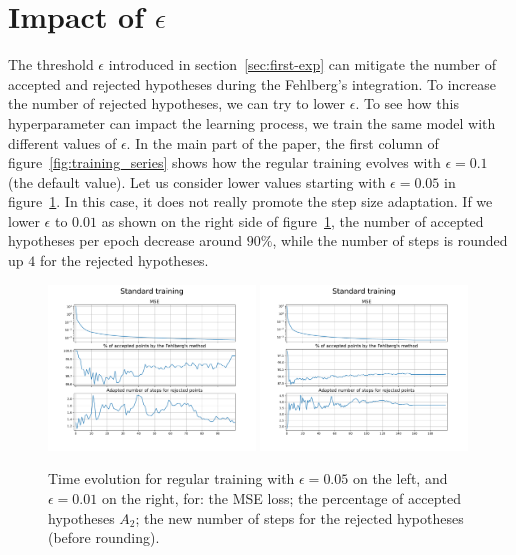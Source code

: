 \documentclass{article}
\newcommand{\eps}{\ensuremath{\epsilon}}
\begin{document}
\section{Impact of $\eps$}
\label{sec:eps}
The threshold $\eps$ introduced in section~\ref{sec:first-exp} can
mitigate the number of accepted and rejected hypotheses during the
Fehlberg's integration. To increase the number of rejected hypotheses,
we can try to lower $\eps$. To see how this hyperparameter can impact
the learning process, we train the same model with different values of
$\eps$. In the main part of the paper, the first column of
figure~\ref{fig:training_series} shows how the regular training
evolves with $\eps=0.1$ (the default value). Let us consider lower
values starting with $\eps=0.05$ in
figure~\ref{fig:training_series_eps}. In this case, it does not really
promote the step size adaptation. If we lower $\eps$ to $0.01$ as
shown on the right side of figure~\ref{fig:training_series_eps}, the
number of accepted hypotheses per epoch decrease around $90\%$, while
the number of steps is rounded up $4$ for the rejected hypotheses.
\begin{figure}[thb]
  \centering
  \includegraphics[width=0.49\textwidth]{./figs/baseline_eps0.05.pdf}
  \includegraphics[width=0.49\textwidth]{./figs/baseline_eps0.01.pdf}
  \caption{Time evolution for regular training with $\eps=0.05$ on the
    left, and $\eps=0.01$ on the right, for: the MSE loss; the
    percentage of accepted hypotheses $A_2$; the new number of steps
    for the rejected hypotheses (before rounding).}
  \label{fig:training_series_eps}
\end{figure}
\end{document}
